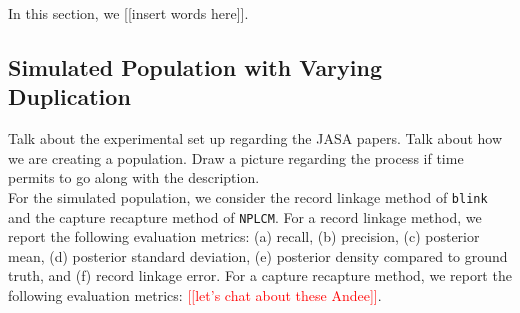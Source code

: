 \documentclass[11pt]{article}
\begin{document}
In this section, we [[insert words here]].

%
%


\subsection{Simulated Population with Varying Duplication}
\label{sec:simdata}

Talk about the experimental set up regarding the JASA papers. 
Talk about how we are creating a population. 
Draw a picture regarding the process if time permits to go along with the description. \\

For the simulated population, we consider the record linkage method of \texttt{blink} and the capture recapture method of \texttt{NPLCM}. For a record linkage method, we report the following evaluation metrics: (a) recall, (b) precision, (c) posterior mean, (d)  posterior standard deviation, (e) posterior density compared to ground truth, and (f) record linkage error. 
For a capture recapture method, we report the following evaluation metrics: \textcolor{red}{[[let's chat about these Andee]]}.


%
%
%
%
\end{document}
